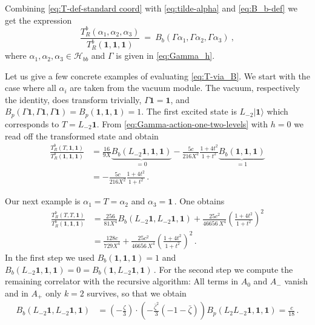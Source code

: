 \documentclass[11pt,a4paper]{article}
\numberwithin{equation}{section}
\def\ket#1{|{#1}\rangle}
\newcommand{\one}{\mathbf{1}} %
\begin{document}
Combining \eqref{eq:T-def-standard coord} with \eqref{eq:tilde-alpha} and \eqref{eq:B_b-def} we get the expression
\begin{equation}\label{eq:T-via_B}
\frac{T_R^b(\alpha_1,\alpha_2,\alpha_3)}{T_R^b(\one,\one,\one)}
~=~ B_b( \Gamma \alpha_1 ,  \Gamma \alpha_2 ,  \Gamma \alpha_3 ) ~,
\end{equation}
where $\alpha_1,\alpha_2,\alpha_3 \in \mathcal{H}_{bb}$ and $\Gamma$ is given in \eqref{eq:Gamma_h}.

Let us give a few concrete examples of evaluating \eqref{eq:T-via_B}. We start with the case where all $\alpha_i$ are taken from the vacuum module.
The vacuum, respectively the identity, does transform trivially, $\Gamma\one=\one$, and $B_p(\Gamma\one,\Gamma\one,\Gamma\one)=B_p(\one,\one,\one)=1$. The first excited state is $L_{-2}\ket{\one}$ which corresponds to $T = L_{-2}\one$. From \eqref{eq:Gamma-action-one-two-levels} with $h=0$ we read off the transformed state and obtain
%
\begin{align}
    \frac{T_R^b(T,\one,\one)}{T_R^b(\one,\one,\one)}
&= \frac{16}{9X}
\underbrace{B_b(  L_{-2}\one  ,  \one ,  \one )}_{=0} - \frac{5c}{216X^2}\frac{1+4t^2}{1+t^2} \underbrace{B_b(  \one,  \one ,  \one )}_{=1} 
\nonumber\\
&= - \frac{5c}{216X^2}\frac{1+4t^2}{1+t^2}\,. \label{eq:L-2vertex}
\end{align}

\noindent 
Our next example is $\alpha_1=T = \alpha_2$ and $\alpha_3=\one$\,. One obtains
%
\begin{align}
    \frac{T_R^b(T,T,\one)}{T_R^b(\one,\one,\one)} &= \frac{256}{81 X^4} B_b(  L_{-2}\one  ,  L_{-2}\one ,  \one ) + \frac{25 c^2}{46656 \,X^4} \left(\frac{1+4t^2}{1+t^2}\right)^2 
    \nonumber\\
    &= \frac{128 c}{729 X^4}  + \frac{25 c^2}{46656 \,X^4} \left(\frac{1+4t^2}{1+t^2}\right)^2\,.
\end{align}
%
In the first step we used $B_b(  \one,  \one ,  \one ) = 1$ and $B_b(  L_{-2}\one  ,  \one ,  \one ) = 0 = B_b(  \one ,L_{-2}\one  ,    \one )$\,. For the second step we compute the remaining correlator with the recursive algorithm: All terms in $A_0$ and $A_-$ vanish and in $A_+$ only $k=2$ survives, so that we obtain
\begin{align}
    B_b( L_{-2}\one  ,  L_{-2}\one ,  \one ) &= \left(- \frac{\zeta}{3}\right) \cdot \left(- \frac{\bar{\zeta}^2}{3}(-1-\bar{\zeta}) \right)  B_p(L_2L_{-2} \one,\one,\one) = \frac{c}{18}\,.
\end{align}
\end{document}
